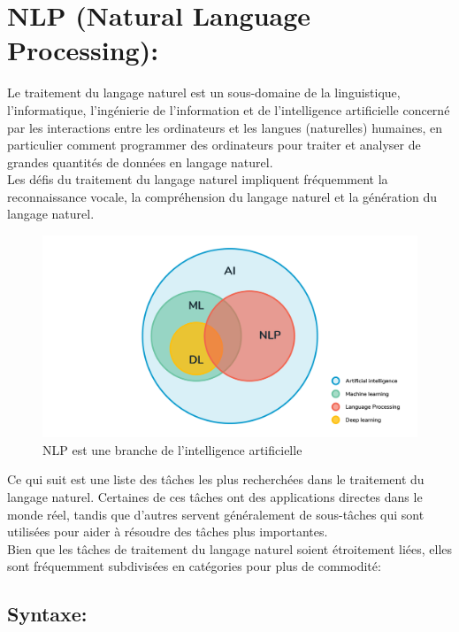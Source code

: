 \section{NLP (Natural Language Processing):}
Le traitement du langage naturel est un sous-domaine de la linguistique, l'informatique, l'ingénierie de l'information et de l'intelligence artificielle concerné par les interactions entre les ordinateurs et les langues (naturelles) humaines, en particulier comment programmer des ordinateurs pour traiter et analyser de grandes quantités de données en langage naturel.\\

Les défis du traitement du langage naturel impliquent fréquemment la reconnaissance vocale, la compréhension du langage naturel et la génération du langage naturel.

\begin{figure}[H]
    \centering
    \includegraphics[width=\textwidth]{etude-theorique-conception/assets/nlp.png}
    \caption{NLP est une branche de l'intelligence artificielle}
    \label{fig:my_label}
\end{figure}

Ce qui suit est une liste des tâches les plus recherchées dans le traitement du langage naturel. Certaines de ces tâches ont des applications directes dans le monde réel, tandis que d'autres servent généralement de sous-tâches qui sont utilisées pour aider à résoudre des tâches plus importantes.\\

Bien que les tâches de traitement du langage naturel soient étroitement liées, elles sont fréquemment subdivisées en catégories pour plus de commodité:

\subsection{Syntaxe:}
